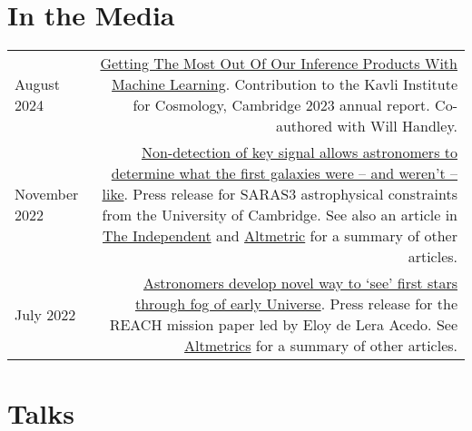 \documentclass{article}
\begin{document}
\section*{In the Media}

\begin{tabular}{L!{\vrule}R}
    August 2024 & \href{https://www.kicc.cam.ac.uk/aboutus/kicc-annual-reports}{Getting The Most Out Of Our Inference Products With Machine Learning}. Contribution to the Kavli Institute for Cosmology, Cambridge 2023 annual report. Co-authored with Will Handley. \\
	November 2022 & \href{https://www.cam.ac.uk/research/news/non-detection-of-key-signal-allows-astronomers-to-determine-what-the-first-galaxies-were-and-werent}{Non-detection of key signal allows astronomers to determine what the first galaxies were – and weren’t – like}. Press release for SARAS3 astrophysical constraints from the University of Cambridge. See also an article in \href{https://www.independent.co.uk/space/galaxies-beginning-cosmic-dawn-signal-b2234570.html?amp}{The Independent} and \href{https://nature.altmetric.com/details/139089769/news}{Altmetric} for a summary of other articles. \\
	July 2022 & \href{https://www.cam.ac.uk/research/news/astronomers-develop-novel-way-to-see-the-first-stars-through-the-fog-of-the-early-universe}{Astronomers develop novel way to ‘see’ first stars through fog of early Universe}. Press release for the REACH mission paper led by Eloy de Lera Acedo. See \href{https://nature.altmetric.com/details/132932581/news}{Altmetrics} for a summary of other articles.
\end{tabular}

\section*{Talks}
\end{document}
